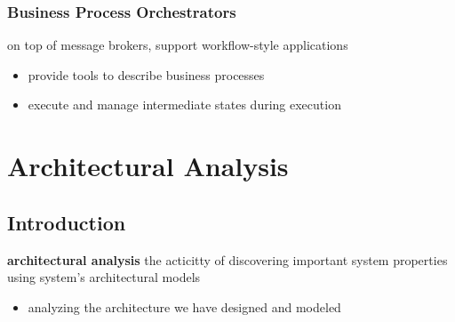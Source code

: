 \documentclass[]{article}
\theoremstyle{definition}
\begin{document}
	\subsubsection{Business Process Orchestrators}
	on top of message brokers, support workflow-style applications
	\begin{itemize}
		\item provide tools to describe business processes
		\item execute and manage intermediate states during execution
	\end{itemize}

	\section{Architectural Analysis}
	\subsection{Introduction}
	\textbf{architectural analysis} the acticitty of discovering important system properties using system's architectural models
	\begin{itemize}
		\item analyzing the architecture we have designed and modeled
	\end{itemize}
\end{document}
